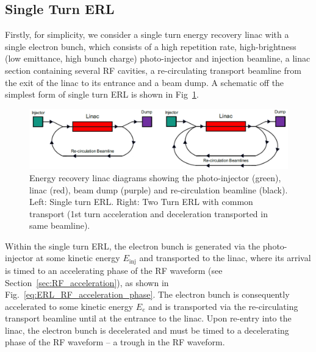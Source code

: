 \documentclass[../main.tex]{subfiles}
\begin{document}
\subsection{Single Turn ERL}
\label{sec:single_turn_ERL}

Firstly, for simplicity, we consider a single turn energy recovery linac with a single electron bunch, which consists of a high repetition rate, high-brightness (low emittance, high bunch charge) photo-injector \cite{ben2016superconducting} and injection beamline, a linac section containing several RF cavities, a re-circulating transport beamline from the exit of the linac to its entrance and a beam dump. A schematic off the simplest form of single turn ERL is shown in Fig~\ref{fig:ERL_schematics}. 

\begin{figure}[!h]
\centering
\includegraphics[width=\textwidth]{Figures/Energy_Recovery_Linac_Design/single_multi_turn_ERL.pdf}
\caption{Energy recovery linac diagrams showing the photo-injector (green), linac (red), beam dump (purple) and re-circulation beamline (black). Left: Single turn ERL. Right: Two Turn ERL with common transport (1st turn acceleration and deceleration transported in same beamline). }
\label{fig:ERL_schematics}
\end{figure}

Within the single turn ERL, the electron bunch is generated via the photo-injector at some kinetic energy $E_{\mathrm{inj}}$ and transported to the linac, where its arrival is timed to an accelerating phase of the RF waveform (see Section~\ref{sec:RF_acceleration}), as shown in Fig.~\ref{eq:ERL_RF_acceleration_phase}. The electron bunch is consequently accelerated to some kinetic energy $E_{e}$ and is transported via the re-circulating transport beamline until at the entrance to the linac. Upon re-entry into the linac, the electron bunch is decelerated and must be timed to a decelerating phase of the RF waveform -- a trough in the RF waveform. 
\end{document}

